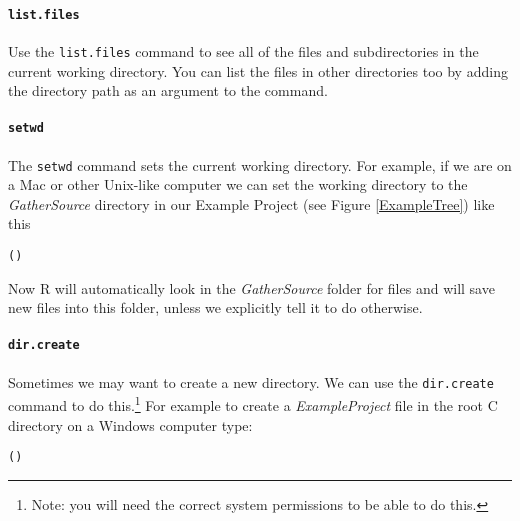 {\paragraph{{\tt{list.files}}}

Use the \texttt{list.files} command to see all of the files and subdirectories in the current working directory. You can list the files in other directories too by adding the directory path as an argument to the command.  

\paragraph{{\tt{setwd}}}

The {\tt{setwd}} command sets the current working directory. For example, if we are on a Mac or other Unix-like computer we can set the working directory to the {\emph{GatherSource}} directory in our Example Project (see Figure \ref{ExampleTree}) like this

\begin{knitrout}
\color{fgcolor}\begin{kframe}
\begin{alltt}
()
\end{alltt}
\end{kframe}
\end{knitrout}


\noindent Now R will automatically look in the {\emph{GatherSource}} folder for files and will save new files into this folder, unless we explicitly tell it to do otherwise.

\paragraph{{\tt{dir.create}}}

Sometimes we may want to create a new directory. We can use the {\tt{dir.create}} command to do this.\footnote{Note: you will need the correct system permissions to be able to do this.} For example to create a {\emph{ExampleProject}} file in the root C directory on a Windows computer type:

\begin{knitrout}
\color{fgcolor}\begin{kframe}
\begin{alltt}
()
\end{alltt}
\end{kframe}
\end{knitrout}


}
